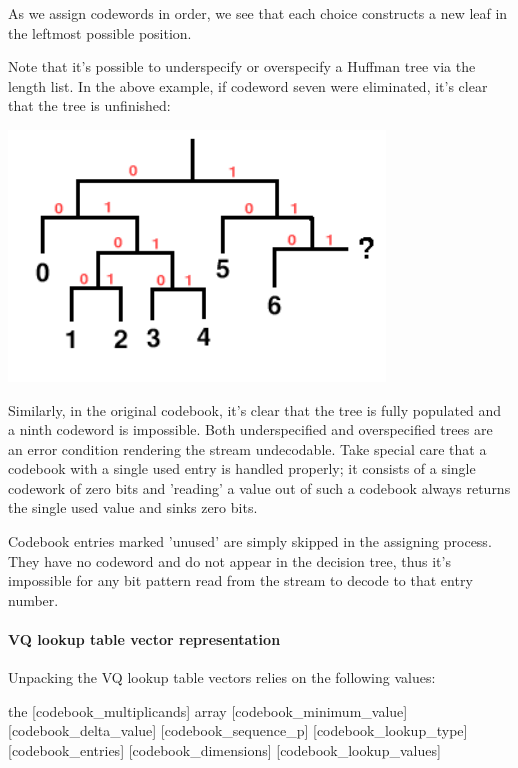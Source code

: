 As we assign codewords in order, we see that each choice constructs a
new leaf in the leftmost possible position.

Note that it's possible to underspecify or overspecify a Huffman tree
via the length list.  In the above example, if codeword seven were
eliminated, it's clear that the tree is unfinished:

\begin{center}
\includegraphics[width=10cm]{hufftree-under}
\end{center}


Similarly, in the original codebook, it's clear that the tree is fully
populated and a ninth codeword is impossible.  Both underspecified and
overspecified trees are an error condition rendering the stream
undecodable. Take special care that a codebook with a single used
entry is handled properly; it consists of a single codework of zero
bits and 'reading' a value out of such a codebook always returns the
single used value and sinks zero bits.

Codebook entries marked 'unused' are simply skipped in the assigning
process.  They have no codeword and do not appear in the decision
tree, thus it's impossible for any bit pattern read from the stream to
decode to that entry number.



\paragraph{VQ lookup table vector representation}

Unpacking the VQ lookup table vectors relies on the following values:
\begin{programlisting}
the [codebook\_multiplicands] array
[codebook\_minimum\_value]
[codebook\_delta\_value]
[codebook\_sequence\_p]
[codebook\_lookup\_type]
[codebook\_entries]
[codebook\_dimensions]
[codebook\_lookup\_values]
\end{programlisting}

